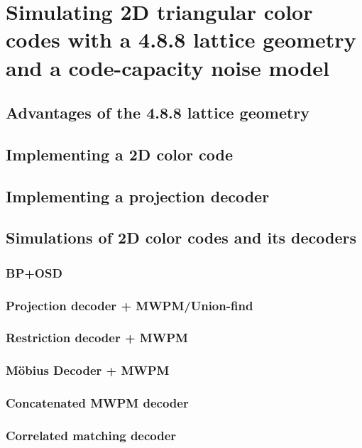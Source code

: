 \chapter{Simulating 2D triangular color codes with a 4.8.8 lattice geometry and a code-capacity noise model}
\label{chap:simulating_2d_color_codes}


\section{Advantages of the 4.8.8 lattice geometry}

\section{Implementing a 2D color code}

\section{Implementing a projection decoder}

\section{Simulations of 2D color codes and its decoders}

\subsection{BP+OSD}

\subsection{Projection decoder + MWPM/Union-find}

\subsection{Restriction decoder + MWPM}

\subsection{Möbius Decoder + MWPM}

\subsection{Concatenated MWPM decoder}

\subsection{Correlated matching decoder}
